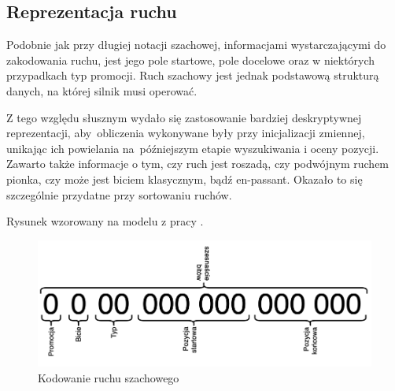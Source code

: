 \subsection{Reprezentacja ruchu}
\label{subsec:reprezentacja-ruchu}

Podobnie jak przy długiej notacji szachowej, informacjami wystarczającymi do zakodowania ruchu, jest jego pole startowe, pole docelowe oraz w niektórych przypadkach typ promocji.
Ruch szachowy jest jednak podstawową strukturą danych, na której silnik musi operować.

Z tego względu słusznym wydało się zastosowanie bardziej deskryptywnej reprezentacji, aby~obliczenia wykonywane były przy inicjalizacji zmiennej, unikając ich powielania na~późniejszym etapie wyszukiwania i oceny pozycji.
Zawarto także informacje o tym, czy ruch jest roszadą, czy podwójnym ruchem pionka, czy może jest biciem klasycznym, bądź en-passant.
Okazało to się szczególnie przydatne przy sortowaniu ruchów.

Rysunek wzorowany na modelu z pracy \cite*{Vrzina2023}.

\begin{figure}[ht]
    \centering
    \includegraphics[width=0.8\linewidth]{rozdzialy/rozdzial01/2_reprezentacja-pozycji/rysunki/kodowanie-ruchu}
    \caption{Kodowanie ruchu szachowego}
    \label{fig:kodowanie-ruchu}
\end{figure}
